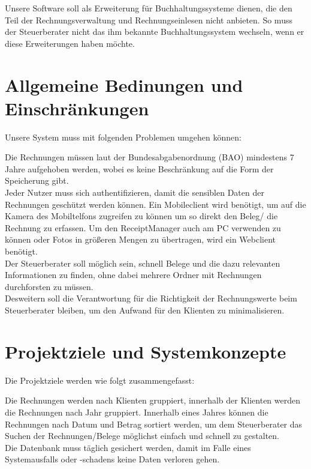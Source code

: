 \documentclass[12pt]{article}
\theoremstyle{definition}
\begin{document}
Unsere Software soll als Erweiterung für Buchhaltungssysteme dienen, die den Teil der Rechnungsverwaltung und Rechnungseinlesen nicht anbieten. So muss der Steuerberater nicht das ihm bekannte Buchhaltungssystem wechseln, wenn er diese Erweiterungen haben möchte.\\
\pagebreak

\section{Allgemeine Bedinungen und Einschränkungen}
Unsere System muss mit folgenden Problemen umgehen können:

Die Rechnungen müssen laut der Bundesabgabenordnung (BAO) mindestens 7 Jahre aufgehoben werden, wobei es keine Beschränkung auf die Form der Speicherung gibt.\\

Jeder Nutzer muss sich authentifizieren, damit die sensiblen Daten der Rechnungen geschützt werden können.
Ein Mobileclient wird benötigt, um auf die Kamera des Mobiltelfons zugreifen zu können um so direkt den Beleg/ die Rechnung zu erfassen. Um den ReceiptManager auch am PC verwenden zu können oder Fotos in größeren Mengen zu übertragen, wird ein Webclient benötigt.\\

Der Steuerberater soll möglich sein, schnell Belege und die dazu relevanten Informationen zu finden, ohne dabei mehrere Ordner mit Rechnungen durchforsten zu müssen.\\

Desweitern soll die Verantwortung für die Richtigkeit der Rechnungswerte beim Steuerberater bleiben, um den Aufwand für den Klienten zu minimalisieren.\\

\pagebreak

\section{Projektziele und Systemkonzepte}
Die Projektziele werden wie folgt zusammengefasst:


Die Rechnungen werden nach Klienten gruppiert, innerhalb der Klienten werden die Rechnungen nach Jahr gruppiert. Innerhalb eines Jahres können die Rechnungen nach Datum und Betrag sortiert werden, um dem Steuerberater das Suchen der Rechnungen/Belege möglichst einfach und schnell zu gestalten.\\

Die Datenbank muss täglich gesichert werden, damit im Falle eines Systemausfalls oder -schadens keine Daten verloren gehen.\\
\end{document}
